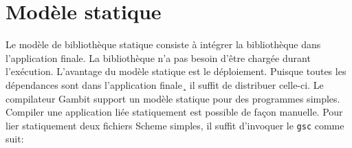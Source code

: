 \section{Modèle statique}

Le modèle de bibliothèque statique consiste à intégrer la bibliothèque
dans l'application finale. La bibliothèque n'a pas besoin d'être chargée
durant l'exécution. L'avantage du modèle statique est le déploiement.
Puisque toutes les dépendances sont dans l'application finale¸ il suffit
de distribuer celle-ci. Le compilateur Gambit support un modèle statique
pour des programmes simples. Compiler une application liée statiquement est
possible de façon manuelle. Pour lier statiquement deux fichiers Scheme
simples, il suffit d'invoquer le \texttt{gsc} comme suit:

\begin{center}
\end{center}



